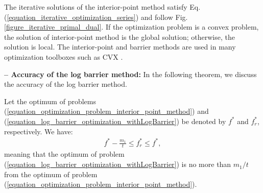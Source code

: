 \documentclass[lang=cn,10pt]{gorgeousnbook}
\numberwithin{equation}{section}%
\numberwithin{figure}{section}%
\begin{document}
The iterative solutions of the interior-point method satisfy Eq. (\ref{equation_iterative_optimization_series}) and follow Fig. \ref{figure_iterative_primal_dual}. 
If the optimization problem is a convex problem, the solution of interior-point method is the global solution; otherwise, the solution is local. 
The interior-point and barrier methods are used in many optimization toolboxes such as CVX \cite{grant2009cvx}.


\hfill\break
\textbf{-- Accuracy of the log barrier method:}
In the following theorem, we discuss the accuracy of the log barrier method.

\begin{theorem}\label{theorem_sub_optimality_logBarrier}
Let the optimum of problems (\ref{equation_optimization_problem_interior_point_method}) and (\ref{equation_log_barrier_optimization_withLogBarrier}) be denoted by $f^*$ and $f_r^*$, respectively. 
We have:
\begin{align}\label{equation_sub_optimality_logBarrier}
f^* - \frac{m_1}{t} \leq f_r^* \leq f^*,
\end{align}
meaning that the optimum of problem (\ref{equation_log_barrier_optimization_withLogBarrier}) is no more than $m_1/t$ from the optimum of problem (\ref{equation_optimization_problem_interior_point_method}). 
\end{theorem}
\end{document}
